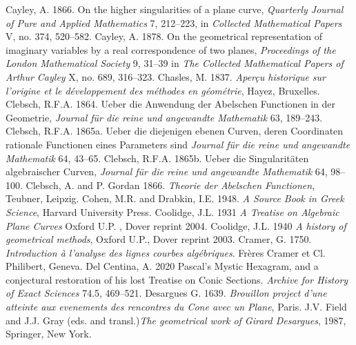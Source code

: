 \newline\indent Cayley, A. 1866. On the higher singularities of a plane curve, \emph{Quarterly Journal of Pure and Applied Mathematics} 7, 212--223, in \emph{Collected Mathematical Papers} V, no. 374, 520--582.
\newline\indent   Cayley, A. 1878. On the geometrical representation of imaginary variables by a real correspondence of two planes, \emph{Proceedings of the  London Mathematical Society} 9, 31--39 in \emph{The Collected Mathematical Papers of Arthur Cayley} X, no. 689, 316--323.
\newline\indent Chasles, M. 1837.  \emph{Aper\c{c}u historique sur l'origine et le d\'eveloppement des m\'ethodes en g\'eom\'etrie}, Hayez, Bruxelles. 
\newline\indent Clebsch, R.F.A. 1864.  Ueber die Anwendung der Abelschen Functionen in der Geometrie, \emph{Journal f\"ur die reine und angewandte Mathematik}  63, 189--243.
\newline\indent Clebsch, R.F.A. 1865a. Ueber die diejenigen ebenen Curven, deren Coordinaten rationale Functionen eines Parameters sind \emph{Journal f\"ur die reine und angewandte Mathematik} 64, 43--65.
\newline\indent Clebsch, R.F.A. 1865b. Ueber die Singularit\"aten algebraischer Curven, \emph{Journal f\"ur die reine und angewandte Mathematik} 64, 98--100.
\newline\indent Clebsch, A. and P. Gordan 1866. \emph{Theorie der Abelschen Functionen}, Teubner, Leipzig.
\newline\indent Cohen, M.R. and Drabkin, I.E. 1948. \emph{A Source Book in Greek Science}, Harvard University Press.
\newline\indent Coolidge, J.L.  1931 \emph{A Treatise on Algebraic Plane Curves} Oxford U.P. , Dover reprint 2004.
\newline\indent Coolidge, J.L.  1940  \emph{A history of geometrical methods}, Oxford U.P., Dover reprint 2003.
\newline\indent Cramer, G. 1750. \emph{Introduction \`a l'analyse des lignes courbes alg\'ebriques}. Fr\`eres Cramer et Cl. Philibert, Geneva.
\newline\indent Del Centina, A. 2020 Pascal's Mystic Hexagram, and a conjectural restoration of his lost Treatise on Conic Sections. \emph{Archive for History of Exact Sciences} 74.5, 469--521.
\newline\indent Desargues G. 1639. \emph{Brouillon project d'une atteinte aux evenements des rencontres du Cone avec un Plane}, Paris.  J.V. Field  and J.J. Gray (eds. and transl.)\emph{The geometrical work of Girard Desargues}, 1987, Springer, New York.
